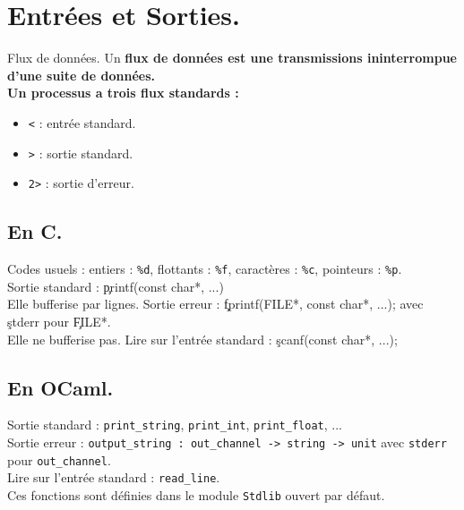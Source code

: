 \documentclass[french, 11pt]{article}
\begin{document}
\section{Entrées et Sorties.}

\begin{defi}{Flux de données.}{}
    Un \bf{flux de données} est une transmissions ininterrompue d'une suite de données.\\
    Un processus a trois flux standards :
    \begin{itemize}
        \item \texttt{<} : entrée standard.
        \item \texttt{>} : sortie standard.
        \item \texttt{2>} : sortie d'erreur.
    \end{itemize}
\end{defi}

\subsection{En C.}

\begin{defi}{}{}
    Codes usuels :  entiers : \texttt{\%d}, flottants : \texttt{\%f}, caractères : \texttt{\%c}, pointeurs : \texttt{\%p}.\\
    Sortie standard : \c{printf(const char*, ...)}\\
    Elle bufferise par lignes.\n
    Sortie erreur : \c{fprintf(FILE*, const char*, ...);} avec \c{stderr} pour \c{FILE*}.\\
    Elle ne bufferise pas.\n
    Lire sur l'entrée standard : \c{scanf(const char*, ...);}
\end{defi}

\subsection{En OCaml.}

\begin{defi}{}{}
    Sortie standard : \texttt{print\_string}, \texttt{print\_int}, \texttt{print\_float}, ...\\
    Sortie erreur : \texttt{output\_string : out\_channel -> string -> unit} avec \texttt{stderr} pour \texttt{out\_channel}.\\
    Lire sur l'entrée standard : \texttt{read\_line}.\\
    Ces fonctions sont définies dans le module \texttt{Stdlib} ouvert par défaut.
\end{defi}
\end{document}
